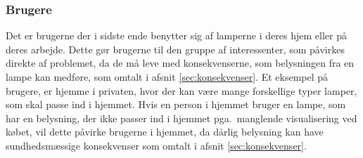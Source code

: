 \subsubsection{Brugere}
Det er brugerne der i sidste ende benytter sig af lamperne i deres hjem eller på deres arbejde. Dette gør brugerne til den gruppe af interessenter, som påvirkes direkte af problemet, da de må leve med konsekvenserne, som belysningen fra en lampe kan medføre, som omtalt i afsnit \ref{sec:konsekvenser}. Et eksempel på brugere, er hjemme i privaten, hvor der kan være mange forskellige typer lamper, som skal passe ind i hjemmet. Hvis en person i hjemmet bruger en lampe, som har en belysning, der ikke passer ind i hjemmet pga.\ manglende visualisering ved købet, vil dette påvirke brugerne i hjemmet, da dårlig belysning kan have sundhedsmæssige konsekvenser som omtalt i afsnit \ref{sec:konsekvenser}.

